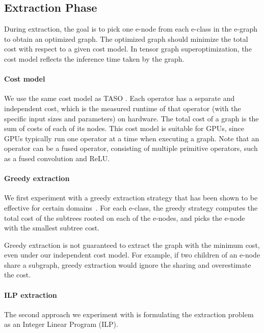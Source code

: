 \subsection{Extraction Phase}

During extraction, the goal is to pick one e-node from each e-class in the e-graph to obtain an optimized graph.
The optimized graph should minimize the total cost with respect to a given cost model.
In tensor graph superoptimization, the cost model reflects the inference time taken by the graph.

\paragraph{Cost model}
We use the same cost model as TASO \cite{taso}.
Each operator has a separate and independent cost, which is the measured runtime of that operator (with the specific input sizes and parameters) on hardware.
The total cost of a graph is the sum of costs of each of its nodes.
This cost model is suitable for GPUs, since GPUs typically run one operator at a time when executing a graph.
Note that an operator can be a fused operator, consisting of multiple primitive operators, such as a fused convolution and ReLU.

\label{sec:extraction}

\paragraph{Greedy extraction}

We first experiment with a greedy extraction strategy that has been shown to be effective for certain domains~\cite{herbie, spores, egg}.
For each e-class, the greedy strategy computes the total cost of the subtrees rooted on each of the e-nodes, and picks the e-node with the smallest subtree cost.

Greedy extraction is not guaranteed to extract the graph with the minimum cost, even under our independent cost model.
For example, if two children of an e-node share a subgraph, greedy extraction would ignore the sharing and overestimate the cost.

\paragraph{ILP extraction}
The second approach we experiment with is formulating the extraction problem as an Integer Linear Program (ILP).

